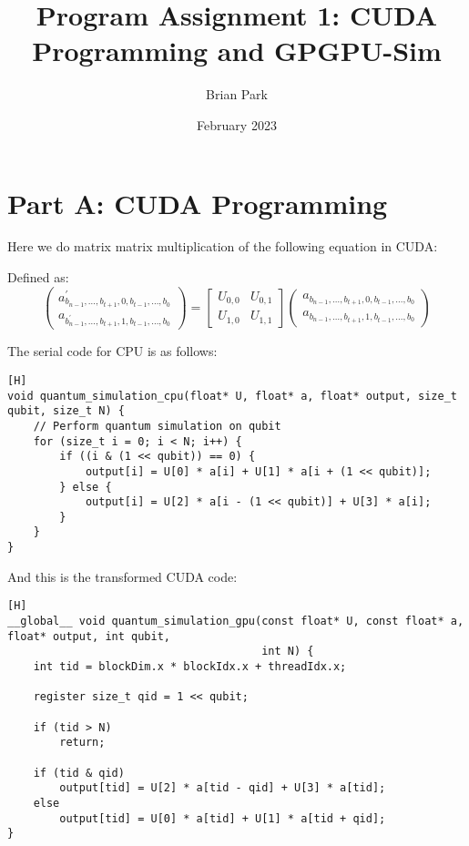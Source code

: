 \documentclass{article}
\title{Program Assignment 1: CUDA Programming and GPGPU-Sim}
\author{Brian Park}
\affil{North Carolina State University, Computer Engineering 786}
\date{February 2023}
\begin{document}
\maketitle

\section{Part A: CUDA Programming}

Here we do matrix matrix multiplication of the following equation in CUDA:

Defined as:
$$\left(\begin{array}{l}
a_{b_{n-1}, \ldots, b_{t+1}, 0, b_{t-1}, \ldots, b_0}^{\prime} \\
a_{b_{n-1}^{\prime}, \ldots, b_{t+1}, 1, b_{t-1}, \ldots, b_0}
\end{array}\right)=\left[\begin{array}{ll}
U_{0,0} & U_{0,1} \\
U_{1,0} & U_{1,1}
\end{array}\right]\left(\begin{array}{l}
a_{b_{n-1}, \ldots, b_{t+1}, 0, b_{t-1}, \ldots, b_0} \\
a_{b_{n-1}, \ldots, b_{t+1}, 1, b_{t-1}, \ldots, b_0}
\end{array}\right)$$

The serial code for CPU is as follows:
\begin{verbatim}[H]
void quantum_simulation_cpu(float* U, float* a, float* output, size_t qubit, size_t N) {
    // Perform quantum simulation on qubit
    for (size_t i = 0; i < N; i++) {
        if ((i & (1 << qubit)) == 0) {
            output[i] = U[0] * a[i] + U[1] * a[i + (1 << qubit)];
        } else {
            output[i] = U[2] * a[i - (1 << qubit)] + U[3] * a[i];
        }
    }
}    
\end{verbatim}

And this is the transformed CUDA code:
\begin{verbatim}[H]
__global__ void quantum_simulation_gpu(const float* U, const float* a, float* output, int qubit,
                                       int N) {
    int tid = blockDim.x * blockIdx.x + threadIdx.x;

    register size_t qid = 1 << qubit;

    if (tid > N)
        return;

    if (tid & qid)
        output[tid] = U[2] * a[tid - qid] + U[3] * a[tid];
    else
        output[tid] = U[0] * a[tid] + U[1] * a[tid + qid];
}
\end{verbatim}
\end{document}
